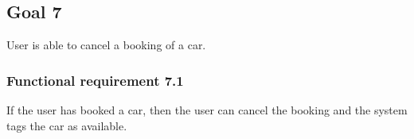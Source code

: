 \subsection{Goal 7}
User is able to cancel a booking of a car.

\setcounter{secnumdepth}{3}
\subsubsection{Functional requirement 7.1}
If the user has booked a car, then the user can cancel the booking and the system tags the car as available.